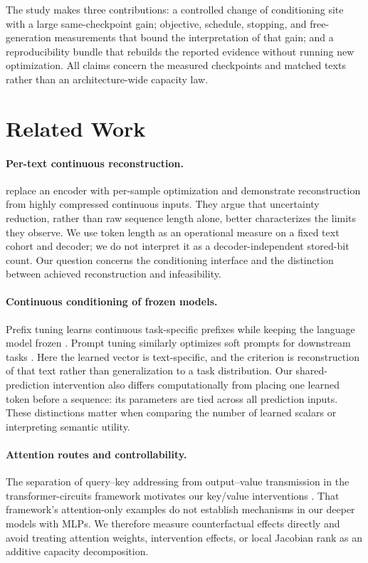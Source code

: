 \documentclass{article}
\begin{document}
The study makes three contributions: a controlled change of conditioning site with a large same-checkpoint gain; objective, schedule, stopping, and free-generation measurements that bound the interpretation of that gain; and a reproducibility bundle that rebuilds the reported evidence without running new optimization.
All claims concern the measured checkpoints and matched texts rather than an architecture-wide capacity law.

\section{Related Work}
\label{sec:related}

\paragraph{Per-text continuous reconstruction.}
\citet{kuratov2025cramming} replace an encoder with per-sample optimization and demonstrate reconstruction from highly compressed continuous inputs.
They argue that uncertainty reduction, rather than raw sequence length alone, better characterizes the limits they observe.
We use token length as an operational measure on a fixed text cohort and decoder; we do not interpret it as a decoder-independent stored-bit count.
Our question concerns the conditioning interface and the distinction between achieved reconstruction and infeasibility.

\paragraph{Continuous conditioning of frozen models.}
Prefix tuning learns continuous task-specific prefixes while keeping the language model frozen \citep{li2021prefix}.
Prompt tuning similarly optimizes soft prompts for downstream tasks \citep{lester2021power}.
Here the learned vector is text-specific, and the criterion is reconstruction of that text rather than generalization to a task distribution.
Our shared-prediction intervention also differs computationally from placing one learned token before a sequence: its parameters are tied across all prediction inputs.
These distinctions matter when comparing the number of learned scalars or interpreting semantic utility.

\paragraph{Attention routes and controllability.}
The separation of query--key addressing from output--value transmission in the transformer-circuits framework motivates our key/value interventions \citep{elhage2021mathematical}.
That framework's attention-only examples do not establish mechanisms in our deeper models with MLPs.
We therefore measure counterfactual effects directly and avoid treating attention weights, intervention effects, or local Jacobian rank as an additive capacity decomposition.
\end{document}
